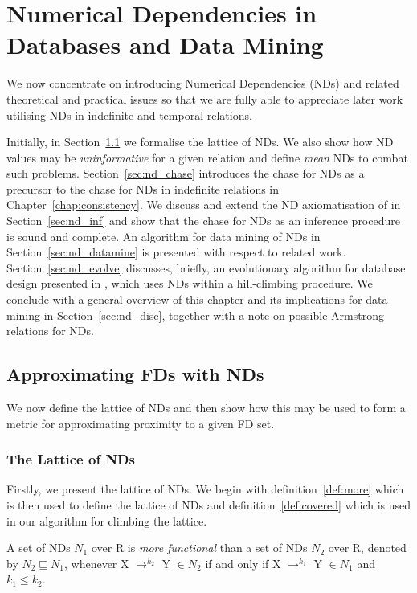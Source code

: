 \chapter{Numerical Dependencies in Databases and Data
Mining}\label{chap:numdep} 

We now concentrate on introducing Numerical Dependencies (NDs) and
related theoretical and practical issues so that we are fully able to
appreciate later work utilising NDs in indefinite and temporal
relations.

\medskip

Initially, in Section~\ref{sec:nd_approx} we formalise the lattice
of NDs. We also show how ND values may be {\em uninformative} for a given
relation and define {\em mean} NDs to combat such
problems. Section~\ref{sec:nd_chase} introduces the chase for NDs as a
precursor to the chase for NDs in indefinite relations in
Chapter~\ref{chap:consistency}. We discuss and extend the ND 
axiomatisation of \cite{gm85a} in Section~\ref{sec:nd_inf}
and show that the chase for NDs as an inference procedure
is sound and complete.
An algorithm for data mining of NDs in
Section~\ref{sec:nd_datamine} is presented with respect to related
work. Section~\ref{sec:nd_evolve} discusses, 
briefly, an evolutionary algorithm for database design presented
in \cite{cl98c}, which uses NDs within a hill-climbing
procedure. We conclude with a general overview of
this chapter and its implications for data mining in
Section~\ref{sec:nd_disc}, together with a note on possible Armstrong
relations for NDs.


\section{Approximating FDs with NDs}\label{sec:nd_approx}
We now define the lattice of NDs and then show how this may be
used to form a metric for approximating proximity to a given FD set. 

\subsection{The Lattice of NDs}
Firstly, we present the lattice of NDs. We begin with
definition~\ref{def:more} which is then used to define the lattice of
NDs and definition~\ref{def:covered} which is used in our algorithm
for climbing the lattice.

\begin{definition}\label{def:more}
\begin{rm}
A set of NDs $N_1$ over R is {\em more functional} than a set of NDs 
$N_2$ over R, denoted by $N_2 \sqsubseteq N_1$, whenever
X $\to^{k_2}$ Y $\in N_2$ if and only if X $\to^{k_1}$ Y $\in N_1$ and 
$k_1 \le k_2$. 
\end{rm}
\end{definition}

